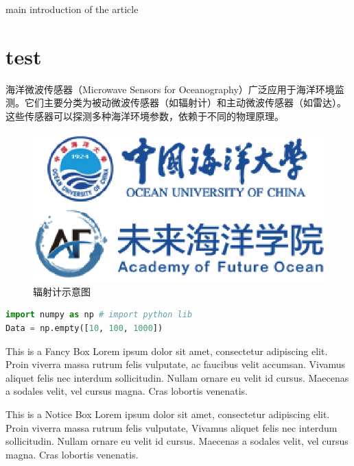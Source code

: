 \documentclass[cn, twoside]{myModel}
\begin{document}
	\maketitle
	\begin{cnabstract}
		\par{}main introduction of the article
	\end{cnabstract}
	\vspace{-2em}
	\section{test}
		\par{}海洋微波传感器（Microwave Sensors for Oceanography）广泛应用于海洋环境监测。它们主要分类为被动微波传感器（如辐射计）和主动微波传感器（如雷达）。这些传感器可以探测多种海洋环境参数，依赖于不同的物理原理。
		\begin{figure}[H]
			\centering
			\includegraphics[width=.6\textwidth]{1564367343.eps}
			\caption{辐射计示意图}
			\label{pic1}
		\end{figure}
		\begin{lstlisting}[language=python,numbers=none]
import numpy as np # import python lib
Data = np.empty([10, 100, 1000])
		\end{lstlisting}
		\begin{box1}{This is a Fancy Box}
			Lorem ipsum dolor sit amet, consectetur adipiscing elit. Proin viverra massa rutrum felis vulputate, ac faucibus velit accumsan. Vivamus aliquet felis nec interdum sollicitudin. Nullam ornare eu velit id cursus. Maecenas a sodales velit, vel cursus magna. Cras lobortis venenatis.
		\end{box1}
		\begin{box2}{This is a Notice Box}
			Lorem ipsum dolor sit amet, consectetur adipiscing elit. Proin viverra massa rutrum felis vulputate,  Vivamus aliquet felis nec interdum sollicitudin. Nullam ornare eu velit id cursus. Maecenas a sodales velit, vel cursus magna. Cras lobortis venenatis.
		\end{box2}
	
\end{document}
